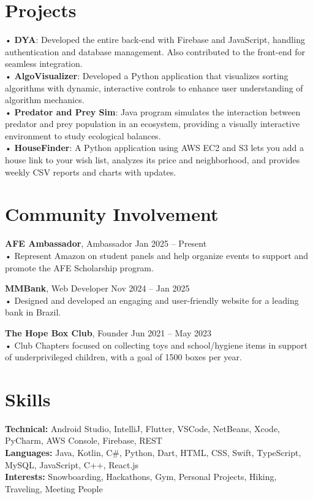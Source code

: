 \documentclass[a4paper,10pt]{article}
\begin{document}
\section*{Projects}
• \textbf{DYA}: Developed the entire back-end with Firebase and JavaScript, handling authentication and database management. Also contributed to the front-end for seamless integration.\\
• \textbf{AlgoVisualizer}: Developed a Python application that visualizes sorting algorithms with dynamic, interactive controls to enhance user understanding of algorithm mechanics.\\
• \textbf{Predator and Prey Sim}: Java program simulates the interaction between predator and prey population in an ecosystem, providing a visually interactive environment to study ecological balances.\\
• \textbf{HouseFinder}: A Python application using AWS EC2 and S3 lets you add a house link to your wish list, analyzes its price and neighborhood, and provides weekly CSV reports and charts with updates.

\section*{Community Involvement}
\textbf{AFE Ambassador}, Ambassador \hfill Jan 2025 – Present \\
• Represent Amazon on student panels and help organize events to support and promote the AFE Scholarship program.

\textbf{MMBank}, Web Developer \hfill Nov 2024 – Jan 2025 \\
• Designed and developed an engaging and user-friendly website for a leading bank in Brazil.

\textbf{The Hope Box Club}, Founder \hfill Jun 2021 – May 2023 \\
• Club Chapters focused on collecting toys and school/hygiene items in support of underprivileged children, with a goal of 1500 boxes per year.

\section*{Skills}
\textbf{Technical:} Android Studio, IntelliJ, Flutter, VSCode, NetBeans, Xcode, PyCharm, AWS Console, Firebase, REST \\
\textbf{Languages:} Java, Kotlin, C\#, Python, Dart, HTML, CSS, Swift, TypeScript, MySQL, JavaScript, C++, React.js \\
\textbf{Interests:} Snowboarding, Hackathons, Gym, Personal Projects, Hiking, Traveling, Meeting People
\end{document}
